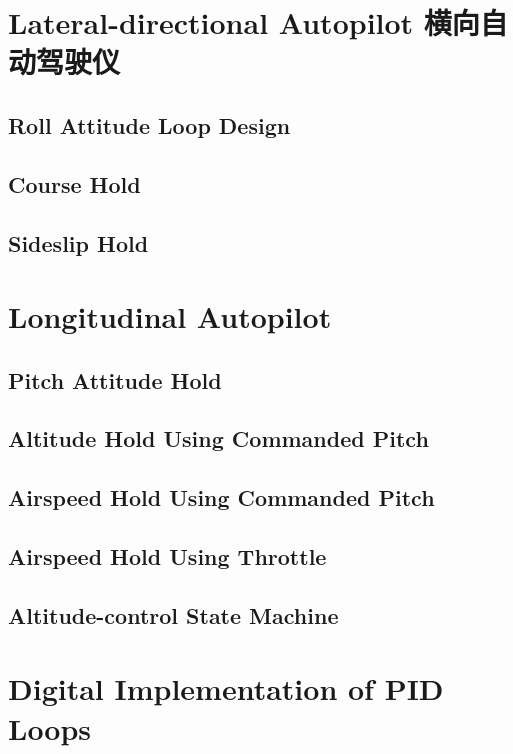\documentclass[UTF8,a4paper,10pt,nocolorlinks]{ctexart}
\begin{document}
    \clearpage

    \section{Lateral-directional Autopilot 横向自动驾驶仪}

    \subsection{Roll Attitude Loop Design }

    \subsection{Course Hold}

    \subsection{Sideslip Hold}

    \section{Longitudinal Autopilot}
    \subsection{Pitch Attitude Hold}

    \subsection{Altitude Hold Using Commanded Pitch}

    \subsection{Airspeed Hold Using Commanded Pitch}
    \subsection{Airspeed Hold Using Throttle}

    \subsection{Altitude-control State Machine}

    \section{Digital Implementation of PID Loops}
\end{document}
